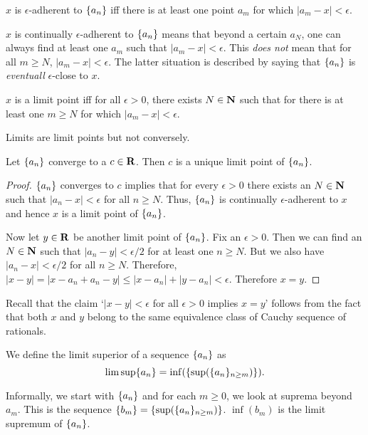 \begin{rem}
$x$ is $\epsilon$-adherent to $\{a_n\}$ iff there is at least one point
$a_m$ for which $|a_m - x| < \epsilon$.
\end{rem}

\begin{rem}
$x$ is continually $\epsilon$-adherent to $\{a_n\}$ means that beyond a
certain $a_N$, one can always find at least one $a_m$ such that $|a_m - x|
< \epsilon$. This \emph{does not} mean that for all $m \ge N$, $|a_m - x|
< \epsilon$. The latter situation is described by saying that $\{a_n\}$
is \emph{eventuall} $\epsilon$-close to $x$.
\end{rem}

\begin{rem}
$x$ is a limit point iff for all $\epsilon > 0$, there exists $N \in \mathbf{N}$
such that for there is at least one $m \ge N$ for which $|a_m - x| < 
\epsilon$.
\end{rem}

Limits are limit points but not conversely.
\begin{prop}\label{c5s4p1}
Let $\{a_n\}$ converge to a $c \in \mathbf{R}$. Then $c$ is a unique limit point 
of $\{a_n\}$.
\end{prop}
\begin{proof}
$\{a_n\}$ converges to $c$ implies that for every $\epsilon > 0$ there 
exists an $N \in \mathbf{N}$ such that $|a_n - x| < \epsilon$ for all $n \ge N$.
Thus, $\{a_n\}$ is continually $\epsilon$-adherent to $x$ and hence $x$
is a limit point of $\{a_n\}$.

Now let $y \in \mathbf{R}$ be another limit point of $\{a_n\}$. Fix an $\epsilon
> 0$. Then we can find an $N \in \mathbf{N}$ such that $|a_n - y| < \epsilon/2$ for
at least one $n \ge N$. But we also have $|a_n - x| < \epsilon/2$ for all 
$n \ge N$. Therefore, $|x - y| = |x - a_n + a_n - y| \le |x - a_n| + 
|y - a_n| < \epsilon$. Therefore $x = y$.
\end{proof}

\begin{rem}
Recall that the claim `$|x - y| < \epsilon$ for all $\epsilon > 0$ implies
$x = y$' follows from the fact that both $x$ and $y$ belong to the same
equivalence class of Cauchy sequence of rationals.
\end{rem}

\begin{defn}\label{c5s4d2}
We define the limit superior of a sequence $\{a_n\}$ as
\[
\limsup\{a_n\} = \inf(\{\sup(\{a_n\}_{n \ge m})\}). 
\]
\end{defn}
Informally, we start with $\{a_n\}$ and for each $m \ge 0$, we look at 
suprema beyond $a_m$. This is the sequence $\{b_m\} = \{
\sup(\{a_n\}_{n \ge m})\}$. $\inf(b_m)$ is the limit supremum of 
$\{a_n\}$.

